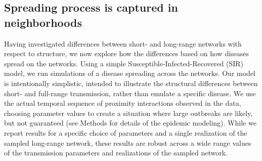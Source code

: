 \documentclass[fleqn,10pt]{wlscirep}
\begin{document}
\subsection*{Spreading process is captured in neighborhoods}
Having investigated differences between short- and long-range networks with respect to structure, we now explore how the differences based on how diseases spread on the networks.
Using a simple Susceptible-Infected-Recovered (SIR) model, we run simulations of a disease spreading across the networks.
Our model is intentionally simplistic, intended to illustrate the structural differences between short- and full-range transmission, rather than emulate a specific disease.
We use the actual temporal sequence of proximity interactions observed in the data, choosing parameter values to create a situation where large outbreaks are likely, but not guaranteed (see Methods for details of the epidemic modeling). 
While we report results for a specific choice of parameters and a single realization of the sampled long-range network, these results are robust across a wide range values of the transmission parameters and realizations of the sampled network.
\end{document}
